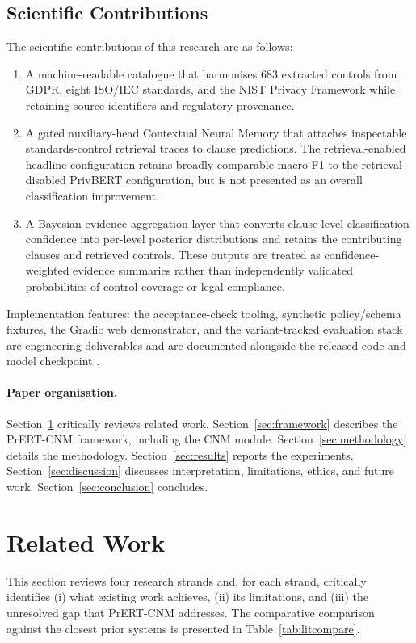 \documentclass[final,3p,times,twocolumn]{elsarticle}
\begin{document}
	\subsection{Scientific Contributions}
	The scientific contributions of this research are as follows:
	\begin{enumerate}
		\item A machine-readable catalogue that harmonises 683 extracted controls from GDPR, eight ISO/IEC standards, and the NIST Privacy Framework while retaining source identifiers and regulatory provenance.

		\item A gated auxiliary-head Contextual Neural Memory that attaches inspectable standards-control retrieval traces to clause predictions. The retrieval-enabled headline configuration retains broadly comparable macro-F1 to the retrieval-disabled PrivBERT configuration, but is not presented as an overall classification improvement.

        \item A Bayesian evidence-aggregation layer that converts clause-level classification confidence into per-level posterior distributions and retains the contributing clauses and retrieved controls. These outputs are treated as confidence-weighted evidence summaries rather than independently validated probabilities of control coverage or legal compliance.

	\end{enumerate}

Implementation features: the acceptance-check tooling, synthetic policy/schema fixtures, the Gradio web demonstrator, and the variant-tracked evaluation stack are engineering deliverables and are documented alongside the released code and model checkpoint \citep{prertcnm_github,prertcnm_huggingface}.

	\paragraph{Paper organisation.}
Section~\ref{sec:literature} critically reviews related work. Section~\ref{sec:framework} describes the PrERT-CNM framework, including the CNM module. Section~\ref{sec:methodology} details the methodology. Section~\ref{sec:results} reports the experiments. Section~\ref{sec:discussion} discusses interpretation, limitations, ethics, and future work. Section~\ref{sec:conclusion} concludes.

	\section{Related Work}
	\label{sec:literature} This section reviews four research strands and, for
	each strand, critically identifies (i) what existing work achieves, (ii) its
	limitations, and (iii) the unresolved gap that PrERT-CNM addresses. The
	comparative comparison against the closest prior systems is presented in Table~\ref{tab:litcompare}.
	
\end{document}
